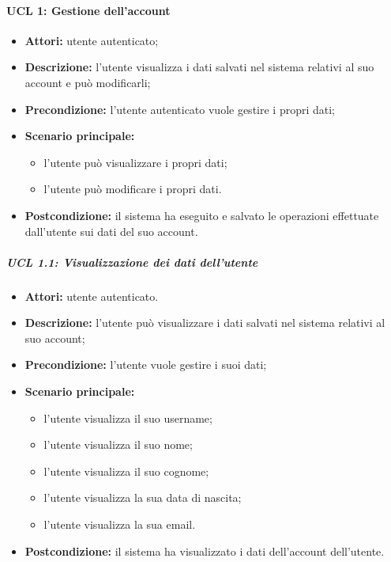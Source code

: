 \paragraph{UCL 1: Gestione dell'account} %
\begin{itemize}
	\item \textbf{Attori:} utente autenticato;
	\item \textbf{Descrizione:} l'utente visualizza i dati salvati nel sistema relativi al suo account e può modificarli;
	\item \textbf{Precondizione:} l'utente autenticato vuole gestire i propri dati;
	\item \textbf{Scenario principale:}
	\begin{itemize}
		\item l'utente può visualizzare i propri dati;
		\item l'utente può modificare i propri dati.
	\end{itemize}
	\item \textbf{Postcondizione:} il sistema ha eseguito e salvato le operazioni effettuate dall'utente sui dati del suo account.
\end{itemize}

\subparagraph{UCL 1.1: Visualizzazione dei dati dell'utente}
\begin{itemize}
	\item \textbf{Attori:} utente autenticato.
	\item \textbf{Descrizione:} l'utente può visualizzare i dati salvati nel sistema relativi al suo account;
	\item \textbf{Precondizione:} l'utente vuole gestire i suoi dati;
	\item \textbf{Scenario principale:}
	\begin{itemize}
		\item l'utente visualizza il suo username;
		\item l'utente visualizza il suo nome;
		\item l'utente visualizza il suo cognome;
		\item l'utente visualizza la sua data di nascita;
		\item l'utente visualizza la sua email.
	\end{itemize}
	\item \textbf{Postcondizione:} il sistema ha visualizzato i dati dell'account dell'utente.
\end{itemize}

